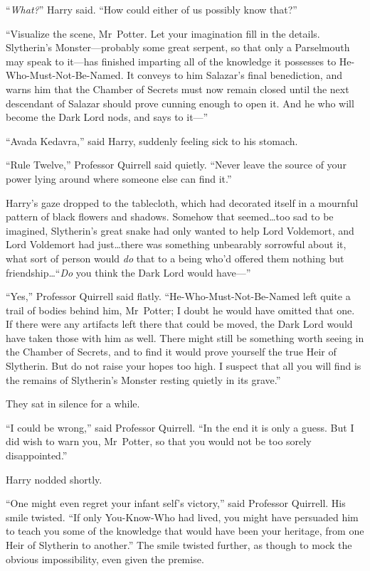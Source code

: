 “\emph{What?}” Harry said.
“How could either of us possibly know that?”

“Visualize the scene, Mr~Potter. Let your imagination fill in the details. Slytherin’s Monster—probably some great serpent, so that only a Parselmouth may speak to it—has finished imparting all of the knowledge it possesses to He-Who-Must-Not-Be-Named. It conveys to him Salazar’s final benediction, and warns him that the Chamber of Secrets must now remain closed until the next descendant of Salazar should prove cunning enough to open it. And he who will become the Dark Lord nods, and says to it—”

“Avada Kedavra,” said Harry, suddenly feeling sick to his stomach.

“Rule Twelve,” Professor Quirrell said quietly.
“Never leave the source of your power lying around where someone else can find it.”

Harry’s gaze dropped to the tablecloth, which had decorated itself in a mournful pattern of black flowers and shadows. Somehow that seemed…too sad to be imagined, Slytherin’s great snake had only wanted to help Lord Voldemort, and Lord Voldemort had just…there was something unbearably sorrowful about it, what sort of person would \emph{do} that to a being who’d offered them nothing but friendship…“\emph{Do} you think the Dark Lord would have—”

“Yes,” Professor Quirrell said flatly.
“He-Who-Must-Not-Be-Named left quite a trail of bodies behind him, Mr~Potter; I doubt he would have omitted that one. If there were any artifacts left there that could be moved, the Dark Lord would have taken those with him as well. There might still be something worth seeing in the Chamber of Secrets, and to find it would prove yourself the true Heir of Slytherin. But do not raise your hopes too high. I suspect that all you will find is the remains of Slytherin’s Monster resting quietly in its grave.”

They sat in silence for a while.

“I could be wrong,” said Professor Quirrell.
“In the end it is only a guess. But I did wish to warn you, Mr~Potter, so that you would not be too sorely disappointed.”

Harry nodded shortly.

“One might even regret your infant self’s victory,” said Professor Quirrell. His smile twisted.
“If only You-Know-Who had lived, you might have persuaded him to teach you some of the knowledge that would have been your heritage, from one Heir of Slytherin to another.” The smile twisted further, as though to mock the obvious impossibility, even given the premise.

